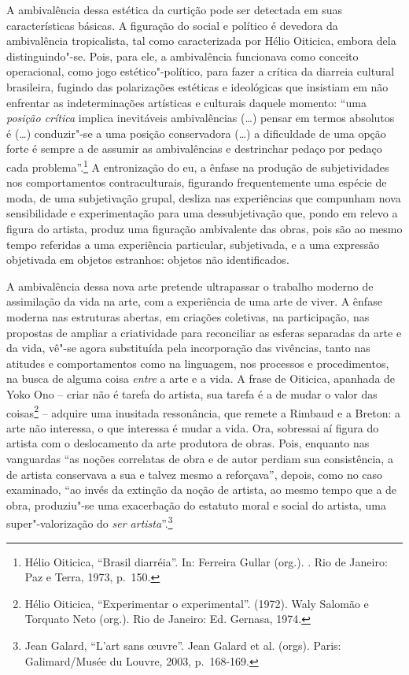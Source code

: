 A ambivalência dessa estética da curtição pode ser detectada em suas
características básicas. A figuração do social e político é devedora da
ambivalência tropicalista, tal como caracterizada por Hélio Oiticica,
embora dela distinguindo"-se. Pois, para ele, a ambivalência funcionava
como conceito operacional, como jogo estético"-político, para fazer a
crítica da diarreia cultural brasileira, fugindo das polarizações
estéticas e ideológicas que insistiam em não enfrentar as
indeterminações artísticas e culturais daquele momento: ``uma
\emph{posição crítica} implica inevitáveis ambivalências (\ldots{}) pensar em
termos absolutos é (\ldots{}) conduzir"-se a uma posição conservadora (\ldots{}) a
dificuldade de uma opção forte é sempre a de assumir as ambivalências e
destrinchar pedaço por pedaço cada problema''.\footnote{Hélio Oiticica,
  ``Brasil diarréia''. In: Ferreira Gullar (org.). {}. Rio de Janeiro: Paz e Terra, 1973, p.~150.} A entronização do
eu, a ênfase na produção de subjetividades nos comportamentos
contraculturais, figurando frequentemente uma espécie de moda, de uma
subjetivação grupal, desliza nas experiências que compunham nova
sensibilidade e experimentação para uma dessubjetivação que, pondo em
relevo a figura do artista, produz uma figuração ambivalente das obras,
pois são ao mesmo tempo referidas a uma experiência particular,
subjetivada, e a uma expressão objetivada em objetos estranhos: objetos
não identificados.

A ambivalência dessa nova arte pretende ultrapassar o trabalho moderno
de assimilação da vida na arte, com a experiência de uma arte de viver.
A ênfase moderna nas estruturas abertas, em criações coletivas, na
participação, nas propostas de ampliar a criatividade para reconciliar
as esferas separadas da arte e da vida, vê"-se agora substituída pela
incorporação das vivências, tanto nas atitudes e comportamentos como na
linguagem, nos processos e procedimentos, na busca de alguma coisa
\emph{entre} a arte e a vida. A frase de Oiticica, apanhada de Yoko Ono
-- criar não é tarefa do artista, sua tarefa é a de mudar o valor das
coisas\footnote{Hélio Oiticica, ``Experimentar o experimental''.
  {} (1972). Waly Salomão e Torquato Neto (org.). Rio de
  Janeiro: Ed. Gernasa, 1974.} -- adquire uma inusitada ressonância, que
remete a Rimbaud e a Breton: a arte não interessa, o que interessa é
mudar a vida. Ora, sobressai aí figura do artista com o deslocamento da
arte produtora de obras. Pois, enquanto nas vanguardas ``as noções
correlatas de obra e de autor perdiam sua consistência, a de artista
conservava a sua e talvez mesmo a reforçava'', depois, como no caso
examinado, ``ao invés da extinção da noção de artista, ao mesmo tempo
que a de obra, produziu"-se uma exacerbação do estatuto moral e social do
artista, uma super"-valorização do \emph{ser artista}''.\footnote{Jean
  Galard, ``L'art sans \oe uvre''. Jean Galard et al. (orgs).
  {} Paris: Galimard/Musée du Louvre, 2003,
  p.~168-169.}


